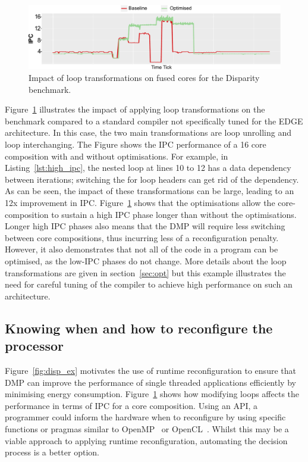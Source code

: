 \begin{figure}[t]
    \includegraphics[width=\textwidth]{cases-paper/graphics/motivation/code_opt_3.pdf}
    \caption{Impact of loop transformations on fused cores for the Disparity benchmark.} 
    \label{fig:compmotiv}
\vspace{1em}
\end{figure}

Figure~\ref{fig:compmotiv} illustrates the impact of applying loop transformations on the  benchmark compared to a standard compiler not specifically tuned for the EDGE architecture.
In this case, the two main transformations are loop unrolling and loop interchanging.
The Figure shows the IPC performance of a 16 core composition with and without optimisations.
For example, in Listing~\ref{lst:high_ipc}, the nested loop at lines 10 to 12 has a data dependency between iterations; switching the for loop headers can get rid of the dependency.
As can be seen, the impact of these transformations can be large, leading to an 12x improvement in IPC.
Figure~\ref{fig:compmotiv} shows that the optimisations allow the core-composition to sustain a high IPC phase longer than without the optimisations.
Longer high IPC phases also means that the DMP will require less switching between core compositions, thus incurring less of a reconfiguration penalty.
However, it also demonstrates that not all of the code in a program can be optimised, as the low-IPC phases do not change.
More details about the loop transformations are given in section~\ref{sec:opt} but this example illustrates the need for careful tuning of the compiler to achieve high performance on such an architecture.

\subsection{Knowing when and how to reconfigure the processor}

Figure~\ref{fig:disp_ex} motivates the use of runtime reconfiguration to ensure that DMP can improve the performance of single threaded applications efficiently by minimising energy consumption.
Figure~\ref{fig:compmotiv} shows how modifying loops affects the performance in terms of IPC for a core composition.
Using an API, a programmer could inform the hardware when to reconfigure by using specific functions or pragmas similar to OpenMP~\cite{openmp} or OpenCL~\cite{opencl}.
Whilst this may be a viable approach to applying runtime reconfiguration, automating the decision process is a better option.

